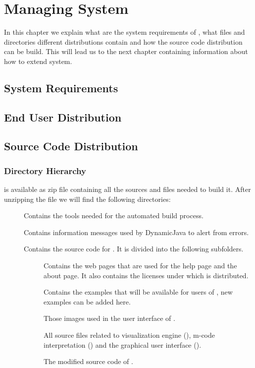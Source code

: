\section{Managing \jel{} System}
\label{sec:Managing_Jeliot_3_System}

In this chapter we explain what are the system requirements of \jel{},
what files and directories different distributions contain and
how the source code distribution can be build. This will lead us to
the next chapter containing information about how to extend \jel{} system.

\subsection{System Requirements}
\label{sec:System_Requirements}

\subsection{End User Distribution}
\label{sec:End_User_Distribution}

\subsection{Source Code Distribution}
\label{sec:Source_Code_Distribution}

\subsubsection{Directory Hierarchy}

\jel{} is available as zip file containing all the sources
and files needed to build it. After unzipping the file we will
find the following directories:
\begin{description}
\item[] Contains the tools needed for the automated build process.
\item[] Contains information messages used by DynamicJava
to alert from errors.
\item[] Contains the source code for \jel{}. It is divided into
the following subfolders.
\begin{description}
\item[] Contains the web pages that are used for the help page
and the about page. It also contains the licenses under which
\jel{} is distributed.
\item[] Contains the examples that will be available for users
of \jel{}, new examples can be added here.
\item[] Those images used in the user interface of \jel{}.
\item[] All source files related to \jel{} visualization engine (),
m-code interpretation () and the graphical user interface ().
\item[] The modified source code of \djava{}.
\end{description}
\end{description}

